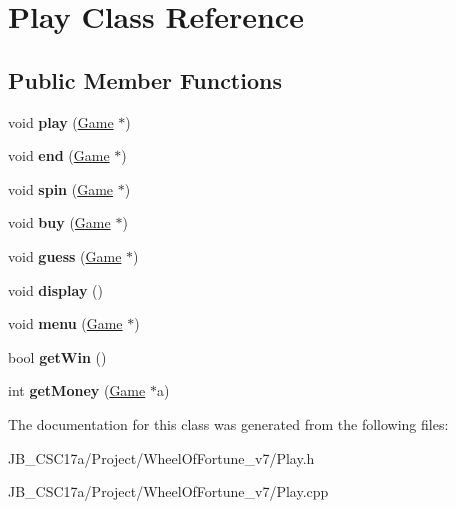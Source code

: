 \hypertarget{class_play}{}\section{Play Class Reference}
\label{class_play}
\subsection*{Public Member Functions}
\begin{DoxyCompactItemize}
\item 
\hypertarget{class_play_a0b4498cdd62a8eebeb10234185e3409d}{}\label{class_play_a0b4498cdd62a8eebeb10234185e3409d} 
void {\bfseries play} (\hyperlink{class_game}{Game} $\ast$)
\item 
\hypertarget{class_play_a7393a0885cbb8d087d657eb430ae5949}{}\label{class_play_a7393a0885cbb8d087d657eb430ae5949} 
void {\bfseries end} (\hyperlink{class_game}{Game} $\ast$)
\item 
\hypertarget{class_play_ae24e22ff4f1c68ae38f987ab066af7bb}{}\label{class_play_ae24e22ff4f1c68ae38f987ab066af7bb} 
void {\bfseries spin} (\hyperlink{class_game}{Game} $\ast$)
\item 
\hypertarget{class_play_ae353cd9ddff43a03f5c7d1f29d99dd57}{}\label{class_play_ae353cd9ddff43a03f5c7d1f29d99dd57} 
void {\bfseries buy} (\hyperlink{class_game}{Game} $\ast$)
\item 
\hypertarget{class_play_a56e8356e639427c516bc83761818ca77}{}\label{class_play_a56e8356e639427c516bc83761818ca77} 
void {\bfseries guess} (\hyperlink{class_game}{Game} $\ast$)
\item 
\hypertarget{class_play_ae9d057ab4c97d7d676ea365ee910cde3}{}\label{class_play_ae9d057ab4c97d7d676ea365ee910cde3} 
void {\bfseries display} ()
\item 
\hypertarget{class_play_a6af79117e524b01d8aa77ad6b3a75c6d}{}\label{class_play_a6af79117e524b01d8aa77ad6b3a75c6d} 
void {\bfseries menu} (\hyperlink{class_game}{Game} $\ast$)
\item 
\hypertarget{class_play_ac8244da334ad843bffa229010b909ad3}{}\label{class_play_ac8244da334ad843bffa229010b909ad3} 
bool {\bfseries get\+Win} ()
\item 
\hypertarget{class_play_a996f01a55184ef4f63c9e54b742d18ad}{}\label{class_play_a996f01a55184ef4f63c9e54b742d18ad} 
int {\bfseries get\+Money} (\hyperlink{class_game}{Game} $\ast$a)
\end{DoxyCompactItemize}


The documentation for this class was generated from the following files\+:\begin{DoxyCompactItemize}
\item 
J\+B\+\_\+\+C\+S\+C17a/\+Project/\+Wheel\+Of\+Fortune\+\_\+v7/Play.\+h\item 
J\+B\+\_\+\+C\+S\+C17a/\+Project/\+Wheel\+Of\+Fortune\+\_\+v7/Play.\+cpp\end{DoxyCompactItemize}
